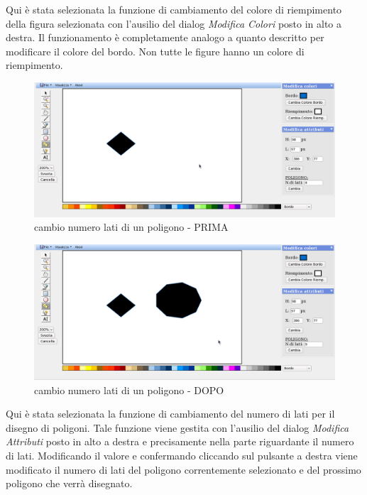  
\vspace{100pt}
Qui \`e stata selezionata la funzione di cambiamento del colore di riempimento della figura selezionata con l'ausilio del dialog \textit{Modifica Colori} posto in alto a destra. Il funzionamento \`e completamente analogo a quanto descritto per modificare il colore del bordo. Non tutte le figure hanno un colore di riempimento.
 
\begin{figure}[!ht]
\centering
\includegraphics[scale=0.4]{images/numero_lati_prima.png}
\caption{cambio numero lati di un poligono - PRIMA}
\end{figure}
 
\begin{figure}[!ht]
\centering
\includegraphics[scale=0.4]{images/numero_lati_dopo.png}
\caption{cambio numero lati di un poligono - DOPO}
\end{figure}
 
\vspace{100pt}
Qui \`e stata selezionata la funzione di cambiamento del numero di lati per il disegno di poligoni. Tale funzione viene gestita con l'ausilio del dialog \textit{Modifica Attributi} posto in alto a destra e precisamente nella parte riguardante il numero di lati. Modificando il valore e confermando cliccando sul pulsante a destra viene modificato il numero di lati del poligono correntemente selezionato e del prossimo poligono che verr\`a disegnato. \\
 
